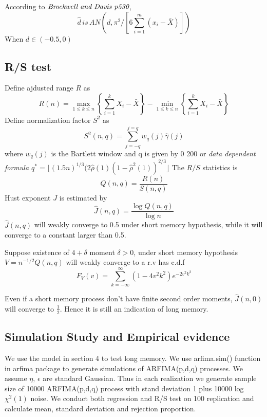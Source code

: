 \documentclass[10pt,a4paper]{article}
\begin{document}
According to $\emph{Brockwell and Davis p530}$\cite{series1997springer}, $$\hat{d}\,is\,AN(d,\pi^2/\left[6\sum_{i=1}^{m}(x_i-\bar{X})\right])$$
When $d\in(-0.5,0)$

\subsection{R/S test}
Define ajdusted range $R$ as \[
R(n)=\max_{1\le k\le n}\left\{\sum_{i=1}^{k}X_i-\bar{X}\right\}-\min_{1\le k\le n}\left\{\sum_{i=1}^{k}X_i-\bar{X}\right\}
\]
Define normalization factor $S^2$ as \[
S^2(n,q)=\sum_{j=-q}^{j=q}w_q(j)\hat{\gamma}(j)
\] where $w_q(j)$ is the Bartlett window and q is given by 0 200 or \emph{data dependent formula $q^*=\lfloor (1.5n)^{1/3}(2\hat{\rho}(1)(1-\hat{\rho}^2(1))^{2/3}\rfloor$}
The $R/S$ statistics is $$Q(n,q)=\frac{R(n)}{S(n,q)}$$
Hust  exponent $J$ is estimated by $$\hat{J}(n,q)=\frac{\log Q(n,q)}{\log n}$$
 $\hat{J}(n,q)$ will weakly converge to 0.5 under short memory hypothesis, while it will converge to a constant larger than 0.5.

Suppose existence of $4+\delta$ moment $\delta>0$, under short memory hypothesis $V=n^{-1/2}Q(n,q)$ will weakly converge to a r.v has c.d.f $$F_V(v)=\sum_{k=-\infty}^{\infty}(1-4v^2k^2)e^{-2v^2k^2}$$ 

Even if a short memory process don't have finite second order moments, $\hat{J}(n,0)$ will converge to $\frac{1}{2}$. Hence it is still an indication of long memory.

\subsection{Simulation Study and Empirical evidence}
We use the model in section 4 to test long memory. We use arfima.sim() function in arfima package to generate simulations of ARFIMA(p,d,q) processes. We assume $\eta,\, \epsilon$ are standard Gaussian. Thus in each realization we generate sample size of 10000 ARFIMA(p,d,q) process with stand deviation 1 plus 10000 log $\chi^2(1)$ noise. We conduct both regression and R/S test on 100 replication and calculate mean, standard deviation and rejection proportion.
\end{document}
